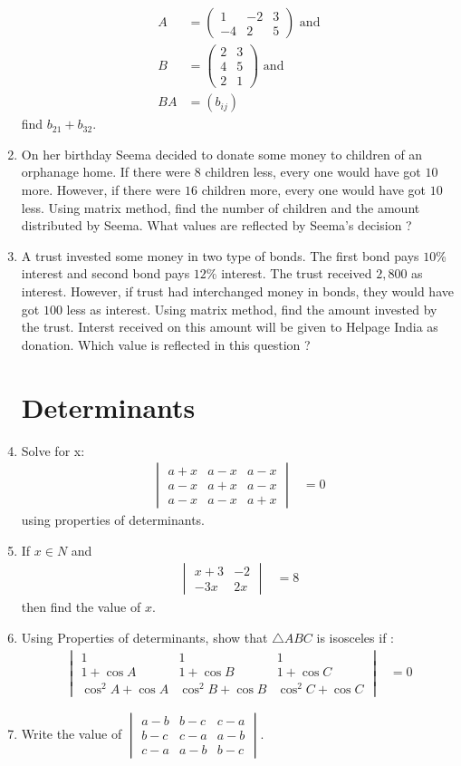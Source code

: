 \documentclass[12pt,-letter paper]{article}
\theoremstyle{remark}
\providecommand{\brak}[1]{\ensuremath{\left(#1\right)}}
\newcommand{\myvec}[1]{\ensuremath{\begin{pmatrix}#1\end{pmatrix}}}
\newcommand{\mydet}[1]{\ensuremath{\begin{vmatrix}#1\end{vmatrix}}}
\begin{document}
\begin{enumerate}
            \begin{align*}
                  A  & =\myvec{1      & -2 & 3 \\-4&2&5} \text{ and}\\
                  B  & =\myvec{2      & 3      \\4&5\\2&1} \text{ and}\\
                  BA & =\brak{b_{ij}}
            \end{align*}
            find $b_{21} + b_{32}$.
      \item On her birthday Seema decided to donate some money to children of an orphanage home. If there were $8$ children less, every one would have got \rupee $10$ more. However, if there were $16$ children more, every one would have got \rupee $10$ less. Using matrix method, find the number of children and the amount distributed by Seema. What values are reflected by Seema's decision ?
      \item A trust invested some money in two type of bonds. The first bond pays $10$\% interest and second bond pays $12$\% interest. The trust received \rupee $2,800$ as interest. However, if trust had interchanged money in bonds, they would have got \rupee $100$ less as interest. Using matrix method, find the amount invested by the trust. Interst received on this amount will be given to Helpage India as donation. Which value is reflected in this question ?
            \section{Determinants}
      \item Solve for x:
            \begin{align*}
                  \mydet{a+x & a-x & a-x \\a-x&a+x& a-x\\a-x & a-x & a+x} &=0
            \end{align*}
            using properties of determinants.
      \item If $x \in N$ and
            \begin{align*}
                  \mydet{x+3 & -2 \\ -3x & 2x} &= 8
            \end{align*}
            then find the value of $x$.

      \item Using Properties of determinants, show that $\triangle ABC$ is isosceles if :
            \begin{align*}
                  \mydet{
                  1                 & 1                 & 1                       \\
                  1+\cos A          & 1+ \cos B         & 1+ \cos C               \\
                  \cos^2 A + \cos A & \cos^2 B + \cos B & \cos^2 C + \cos C} & =0
            \end{align*}
      \item Write the value of
            \mydet{a-b & b-c & c-a \\
                  b-c & c-a & a-b\\
                  c-a & a-b & b-c
            }.

\end{enumerate}
\end{document}
